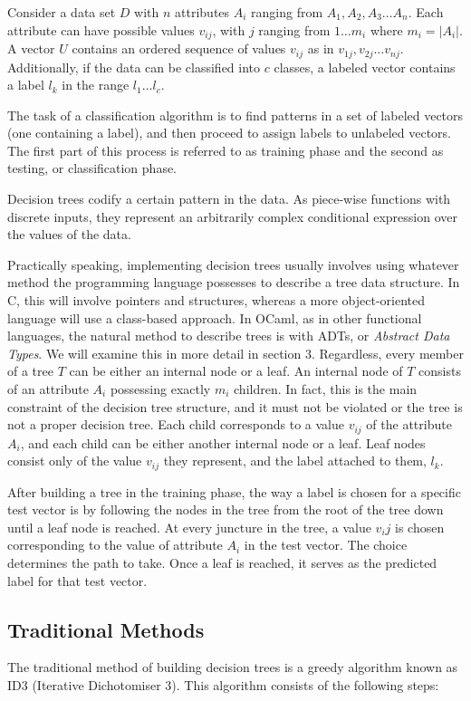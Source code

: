 \documentclass[12pt, letterpaper]{article}
\begin{document}
Consider a data set $D$ with $n$ attributes $A_i$ ranging from $A_1, A_2, A_3 \dots A_n$. Each attribute can have possible values $v_{ij}$, with $j$ ranging from $1\dots m_i$ where $m_i = |A_i|$. A vector $U$ contains an ordered sequence of values $v_{ij}$ as in $v_{1j}, v_{2j}\dots v_{nj}$. Additionally, if the data can be classified into $c$ classes, a labeled vector contains a label $l_k$ in the range $l_1\dots l_c$. 

The task of a classification algorithm is to find patterns in a set of labeled vectors (one containing a label), and then proceed to assign labels to unlabeled vectors. The first part of this process is referred to as training phase and the second as testing, or classification phase.

Decision trees codify a certain pattern in the data. As piece-wise functions with discrete inputs, they represent an arbitrarily complex conditional expression over the values of the data. 

Practically speaking, implementing decision trees usually involves using whatever method the programming language possesses to describe a tree data structure. In C, this will involve pointers and structures, whereas a more object-oriented language will use a class-based approach. In OCaml, as in other functional languages, the natural method to describe trees is with ADTs, or \emph{Abstract Data Types}. We will examine this in more detail in section 3. Regardless, every member of a tree $T$ can be either an internal node or a leaf. An internal node of $T$ consists of an attribute $A_i$ possessing exactly $m_i$ children. In fact, this is the main constraint of the decision tree structure, and it must not be violated or the tree is not a proper decision tree. Each child corresponds to a value $v_{ij}$ of the attribute $A_i$, and each child can be either another internal node or a leaf. Leaf nodes consist only of the value $v_{ij}$ they represent, and the label attached to them, $l_k$.

After building a tree in the training phase, the way a label is chosen for a specific test vector is by following the nodes in the tree from the root of the tree down until a leaf node is reached. At every juncture in the tree, a value $v_ij$ is chosen corresponding to the value of attribute $A_i$ in the test vector. The choice determines the path to take. Once a leaf is reached, it serves as the predicted label for that test vector.

\subsection{Traditional Methods}
The traditional method of building decision trees is a greedy algorithm known as ID3 (Iterative Dichotomiser 3)\cite{quinlan1986induction}. This algorithm consists of the following steps:
\end{document}
